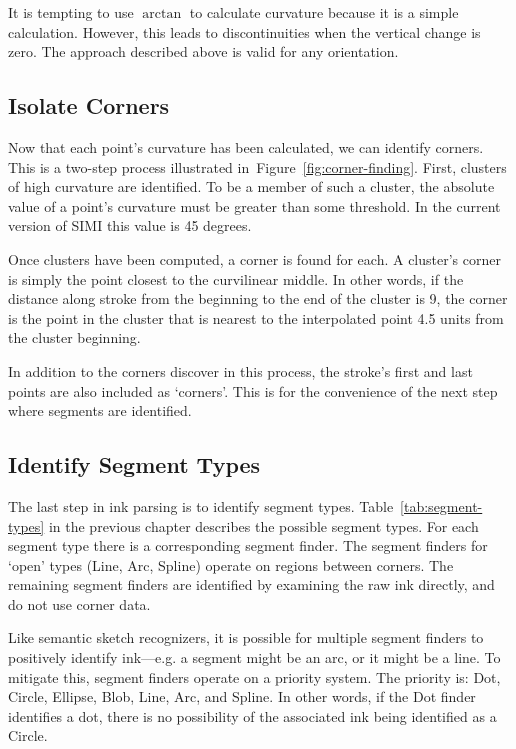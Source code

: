 It is tempting to use $\arctan$ to calculate curvature because it is a
simple calculation. However, this leads to discontinuities when the
vertical change is zero. The approach described above is valid for any
orientation.

\subsection{Isolate Corners}

Now that each point's curvature has been calculated, we can identify
corners. This is a two-step process illustrated
in~Figure~\ref{fig:corner-finding}. First, clusters of high curvature
are identified. To be a member of such a cluster, the absolute value
of a point's curvature must be greater than some threshold. In the
current version of SIMI this value is 45 degrees.



Once clusters have been computed, a corner is found for each. A
cluster's corner is simply the point closest to the curvilinear
middle. In other words, if the distance along stroke from the
beginning to the end of the cluster is 9, the corner is the point in
the cluster that is nearest to the interpolated point 4.5 units from
the cluster beginning.

In addition to the corners discover in this process, the stroke's
first and last points are also included as `corners'. This is for the
convenience of the next step where segments are identified.

\subsection{Identify Segment Types}

The last step in ink parsing is to identify segment
types. Table~\ref{tab:segment-types} in the previous chapter describes
the possible segment types. For each segment type there is a
corresponding segment finder. The segment finders for `open' types
(Line, Arc, Spline) operate on regions between corners. The remaining
segment finders are identified by examining the raw ink directly, and
do not use corner data.

Like semantic sketch recognizers, it is possible for multiple segment
finders to positively identify ink---e.g. a segment might be an arc,
or it might be a line. To mitigate this, segment finders operate on a
priority system. The priority is: Dot, Circle, Ellipse, Blob, Line,
Arc, and Spline. In other words, if the Dot finder identifies a dot,
there is no possibility of the associated ink being identified as a
Circle.

